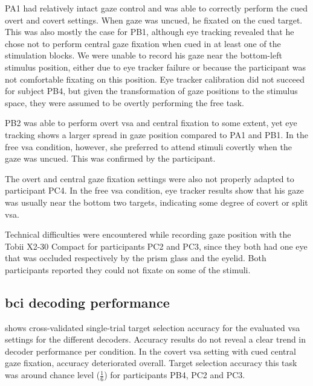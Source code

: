 \documentclass{article}
\begin{document}
PA1 had relatively intact gaze control and was able to correctly perform the
cued overt and covert settings.
When gaze was uncued, he fixated on the cued target.
This was also mostly the case for PB1, although eye tracking revealed that he
chose not to perform central gaze fixation when cued in at least one of the
stimulation blocks. We were unable to record his gaze near the bottom-left
stimulus position, either due to eye tracker failure or because the participant
was not comfortable fixating on this position.
Eye tracker calibration did not succeed for subject PB4, but given the
transformation of gaze positions to the stimulus space, they were assumed to
be overtly performing the free task.

PB2 was able to perform overt \ac{vsa} and central fixation to some extent,
yet eye tracking shows a larger spread in gaze position compared to
PA1 and PB1.
In the free \ac{vsa} condition, however, she preferred to attend
stimuli covertly when the gaze was uncued.
This was confirmed by the participant.

The overt and central gaze fixation settings were also not properly adapted to
participant PC4.
In the free \ac{vsa} condition, eye tracker results show that his gaze was usually near the
bottom two targets, indicating some degree of covert or split \ac{vsa}.

Technical difficulties were encountered while recording gaze position with the
Tobii X2-30
Compact for participants PC2 and PC3, since they both had one eye that was
occluded respectively by the prism glass and the eyelid.
Both participants reported they could not fixate on some of the
stimuli.

\subsection{\Acs{bci} decoding performance}

 shows cross-validated single-trial target selection
accuracy for the evaluated \ac{vsa} settings for the different decoders.
Accuracy results do not reveal a clear trend in decoder performance per
condition.
In the covert \ac{vsa} setting with cued central gaze fixation, accuracy
deteriorated overall.
Target selection accuracy this task was around chance level ($\frac{1}{6}$) for
participants PB4, PC2 and PC3.
\end{document}
